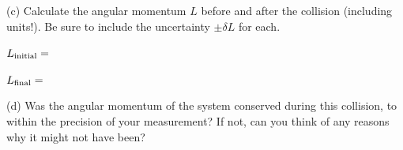 (c) Calculate the angular momentum $L$ before and after the collision (including units!).  Be sure to include the uncertainty $\pm\delta L$ for each.

\medskip
\hspace{0.5in} $L_{\rm initial} =$
\answerspace{0.6in}

\hspace{0.5in} $L_{\rm final} =$
\answerspace{0.6in}

(d) Was the angular momentum of the system conserved during this collision, to within the precision of your measurement?  If not, can you think of any reasons why it might not have been?
\answerspace{0.6in}


